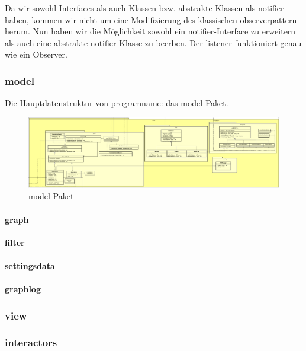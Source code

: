Da wir sowohl Interfaces als auch Klassen bzw. abstrakte Klassen als
\gls{notifier} haben, kommen wir nicht um eine Modifizierung des klassischen
\gls{observerpattern} herum. Nun haben wir die Möglichkeit sowohl ein
\gls{notifier}-Interface zu erweitern als auch eine abstrakte
\gls{notifier}-Klasse zu beerben. Der \gls{listener} funktioniert genau wie ein
Observer.


\subsubsection{model}


Die Hauptdatenstruktur von \gls{programname}: das model Paket.

\begin{figure}[H]
  \centering
  \includegraphics[width=\textwidth]{../diagramimages/model.png}
  \caption{model Paket}
\end{figure}

    \paragraph{graph}

    \paragraph{filter}

    \paragraph{settingsdata}

    \paragraph{graphlog}


\subsubsection{view}


\subsubsection{interactors}
